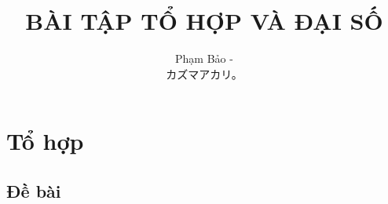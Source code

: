 \documentclass[11pt]{scrartcl}
\begin{document}
\title{\vspace{-2em}\textcolor{bk}{\textbf{BÀI TẬP TỔ HỢP VÀ ĐẠI SỐ}}}

\author{Phạm Bảo -\begin{CJK}{UTF8}{ipxm} カズマアカリ。\end{CJK}\vspace{-1em}}


\thispagestyle{empty}

\tableofcontents


\section{\huge Tổ hợp}
\subsection{\LARGE \textcolor{dk}{Đề bài}}
\end{document}
